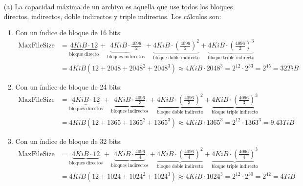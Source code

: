 \documentclass[openany]{book}
\begin{document}
\begin{rta}
    \begin{itemize}
        \item[(a)] La capacidad máxima de un archivo es aquella que use todos los bloques directos, indirectos, doble indirectos y triple indirectos. Los cálculos son:
        \begin{enumerate}
            \item Con un índice de bloque de 16 bits:
            \begin{align*}
                \text{MaxFileSize} &= \underbrace{4KiB \cdot 12}_{\text{bloque directo}} + \underbrace{4KiB \cdot \frac{4096}{2}}_{\text{bloques indirectos}} + \underbrace{4KiB \cdot \left( \frac{4096}{2} \right)^2}_{\text{bloque doble indirecto}} + \underbrace{4KiB \cdot \left( \frac{4096}{2} \right)^3}_{\text{bloque triple indirecto}} \\
                                   &= 4KiB (12 + 2048 + 2048^2 + 2048^3) \approx 4KiB \cdot 2048^3 = 2^{12} \cdot 2^{33} = 2^{45} = 32TiB
            \end{align*}
            \item Con un índice de bloque de 24 bits:
            \begin{align*}
                \text{MaxFileSize} &= \underbrace{4KiB \cdot 12}_{\text{bloques directos}} + \underbrace{4KiB \cdot \frac{4096}{3}}_{\text{bloques indirectos}} + \underbrace{4KiB \cdot \left( \frac{4096}{3} \right)^2}_{\text{bloque doble indirecto}} + \underbrace{4KiB \cdot \left( \frac{4096}{3} \right)^3}_{\text{bloque triple indirecto}} \\
                                   &= 4KiB (12 + 1365 + 1365^2 + 1365^3) \approx 4KiB \cdot 1365^3 = 2^{12} \cdot 1363^3 = 9.43TiB
            \end{align*}
            \item Con un índice de bloque de 32 bits:
            \begin{align*}
                \text{MaxFileSize} &= \underbrace{4KiB \cdot 12}_{\text{bloques directos}} + \underbrace{4KiB \cdot \frac{4096}{4}}_{\text{bloques indirectos}} + \underbrace{4KiB \cdot \left( \frac{4096}{4} \right)^2}_{\text{bloque doble indirecto}} + \underbrace{4KiB \cdot \left( \frac{4096}{4} \right)^3}_{\text{bloque triple indirecto}} \\
                                   &= 4KiB (12 + 1024 + 1024^2 + 1024^3) \approx 4KiB \cdot 1024^3 = 2^{12} \cdot 2^{30} = 2^{42} = 4TiB
            \end{align*}

\end{enumerate}
\end{itemize}
\end{rta}
\end{document}
